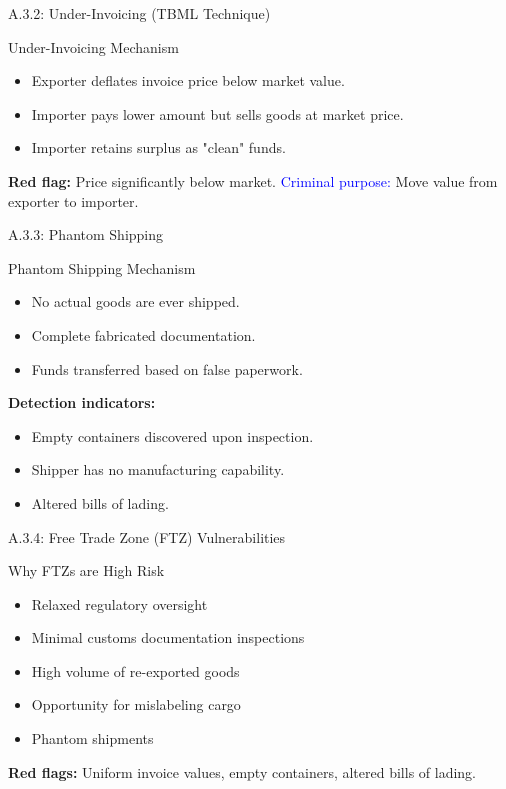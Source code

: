 \documentclass{beamer}
\begin{document}
	\begin{frame}{A.3.2: Under-Invoicing (TBML Technique)}
		\begin{block}{Under-Invoicing Mechanism}
			\begin{itemize}
				\item Exporter deflates invoice price below market value.
				\item Importer pays lower amount but sells goods at market price.
				\item Importer retains surplus as "clean" funds.
			\end{itemize}
		\end{block}
		\textbf{Red flag:} Price significantly below market.
		\textcolor{blue}{Criminal purpose:} Move value from exporter to importer.
	\end{frame}
	
	\begin{frame}{A.3.3: Phantom Shipping}
		\begin{block}{Phantom Shipping Mechanism}
			\begin{itemize}
				\item No actual goods are ever shipped.
				\item Complete fabricated documentation.
				\item Funds transferred based on false paperwork.
			\end{itemize}
		\end{block}
		\textbf{Detection indicators:}
		\begin{itemize}
			\item Empty containers discovered upon inspection.
			\item Shipper has no manufacturing capability.
			\item Altered bills of lading.
		\end{itemize}
	\end{frame}
	
	\begin{frame}{A.3.4: Free Trade Zone (FTZ) Vulnerabilities}
		\begin{block}{Why FTZs are High Risk}
			\begin{itemize}
				\item Relaxed regulatory oversight
				\item Minimal customs documentation inspections
				\item High volume of re-exported goods
				\item Opportunity for mislabeling cargo
				\item Phantom shipments
			\end{itemize}
		\end{block}
		\textbf{Red flags:} Uniform invoice values, empty containers, altered bills of lading.
	\end{frame}
	
\end{document}

